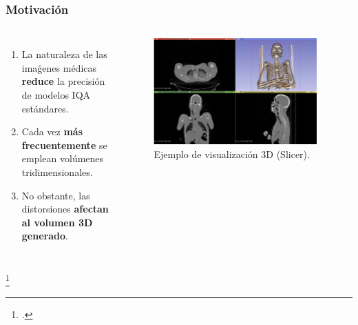 \begin{frame}
  \frametitle{Motivación}
  \begin{columns}
    \begin{enumerate}
    \item La naturaleza de las imaǵenes médicas \textbf{reduce} la precisión de modelos IQA estándares.
    \item Cada vez \textbf{más frecuentemente} se emplean volúmenes tridimensionales.
    \item No obstante, las distorsiones \textbf{afectan al volumen 3D generado}. 
    \end{enumerate}
  \begin{figure}
    \begin{center}
      \includegraphics[width=0.95\textwidth]{imagenes/chapter1/SlicerVisualization}
    \end{center}
    \caption{Ejemplo de visualización 3D (Slicer\footnotemark).}
  \end{figure}
  \end{columns}
  \footcitetext{Slicer3D}
\end{frame}


